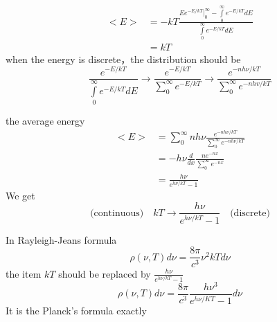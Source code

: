 \begin{frame}
    \begin{equation*}
        \begin{split}
            <E> &= -kT \frac{Ee^{-E / k T}\vert_0 ^\infty-\int\limits_{0}^{\infty} e^{-E / k T} d E } {\int\limits_{0}^{\infty} e^{-E / k T} d E }\\  
                &= kT
        \end{split}  
    \end{equation*} 
    \bullet when the energy is discrete，the distribution should be   
    \begin{equation*}
        \frac{e^{-E / k T}}{\int\limits_{0}^{\infty} e^{-E / k T} d E} 
        \to \frac{e^{-E / k T}}{\sum\limits_{0}^{\infty} e^{-E / k T}} 
        \to \frac{e^{-nh\nu / k T}}{\sum\limits_{0}^{\infty} e^{-nhv / k T}} 
    \end{equation*}    
\end{frame}

\begin{frame}
    the average energy 
    \begin{equation*}
        \begin{split}
            <E> &= \sum\limits_{0}^{\infty} nh\nu\frac{e^{-nh\nu / k T}}{\sum\limits_{0}^{\infty} e^{-nh\nu / k T}} \\
            &= -h\nu \frac{d}{dx} \frac{n e^{-nx}}{\sum\limits_{0}^{\infty} e^{-nx}} \\
            &= \frac{h\nu}{e^{h\nu/kT}-1} 
        \end{split} 
    \end{equation*}
    We get
    \begin{equation*}
        \text{(continuous)} \quad k T \rightarrow \frac{h \nu}{e^{ h \nu / k T}-1} \quad \text{(discrete)} 
    \end{equation*}
\end{frame}

\begin{frame}
    In Rayleigh-Jeans formula
    \begin{equation*}
        \rho(\nu, T) d \nu=\frac{8 \pi}{c^{3}} \nu^{2} k T d \nu 
    \end{equation*}
    the item $kT$ should be replaced by $\frac{h \nu}{e^{ h \nu / k T}-1}$
    \begin{equation*}
        \rho(\nu, T) d \nu=\frac{8 \pi}{c^{3}} \frac{h \nu^{3}}{e^{h \nu / K T}-1} d \nu
    \end{equation*}
    It is the Planck's formula exactly 
\end{frame}

